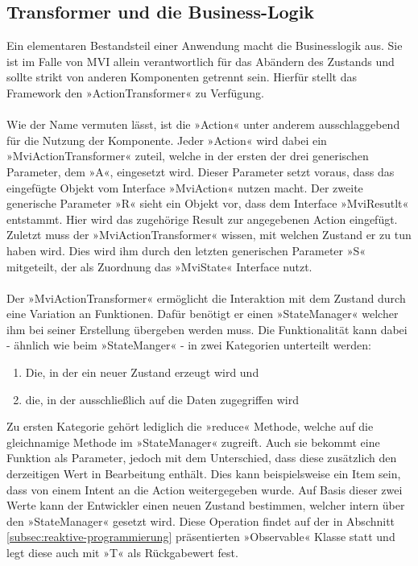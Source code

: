\subsection{Transformer und die Business-Logik}
Ein elementaren Bestandsteil einer Anwendung macht die Businesslogik aus. Sie ist im Falle von MVI allein verantwortlich für das Abändern des Zustands und sollte strikt von anderen Komponenten getrennt sein. Hierfür stellt das Framework den »ActionTransformer« zu Verfügung.
\\\\
Wie der Name vermuten lässt, ist die »Action« unter anderem ausschlaggebend für die Nutzung der Komponente. Jeder »Action« wird dabei ein »MviActionTransformer« zuteil, welche in der ersten der drei generischen Parameter, dem »A«, eingesetzt wird. Dieser Parameter setzt voraus, dass das eingefügte Objekt vom Interface »MviAction« nutzen macht. Der zweite generische Parameter »R« sieht ein Objekt vor, dass dem Interface »MviResutlt« entstammt. Hier wird das zugehörige Result zur angegebenen Action eingefügt. Zuletzt muss der »MviActionTransformer« wissen, mit welchen Zustand er zu tun haben wird. Dies wird ihm durch den letzten generischen Parameter »S« mitgeteilt, der als Zuordnung das »MviState« Interface nutzt. 
\\\\
Der »MviActionTransformer« ermöglicht die Interaktion mit dem Zustand durch eine Variation an Funktionen. Dafür benötigt er einen »StateManager« welcher ihm bei seiner Erstellung übergeben werden muss. Die Funktionalität kann dabei - ähnlich wie beim »StateManger« - in zwei Kategorien unterteilt werden:
\begin{enumerate}
	\item Die, in der ein neuer Zustand erzeugt wird und
	\item die, in der ausschließlich auf die Daten zugegriffen wird
\end{enumerate} 
Zu ersten Kategorie gehört lediglich die »reduce« Methode, welche auf die gleichnamige Methode im »StateManager« zugreift. Auch sie bekommt eine Funktion als Parameter, jedoch mit dem Unterschied, dass diese zusätzlich den derzeitigen Wert in Bearbeitung enthält. Dies kann beispielsweise ein Item sein, dass von einem Intent an die Action weitergegeben wurde. Auf Basis dieser zwei Werte kann der Entwickler einen neuen Zustand bestimmen, welcher intern über den »StateManager« gesetzt wird. Diese Operation findet auf der in Abschnitt
\ref{subsec:reaktive-programmierung}
präsentierten »Observable« Klasse statt und legt diese auch mit »T« als Rückgabewert fest.
